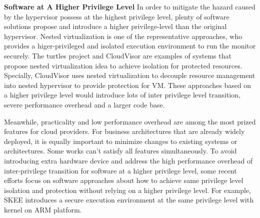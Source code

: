 \documentclass[conference]{IEEEtran}
\begin{document}
 
\textbf{Software at A Higher Privilege Level}
In order to mitigate the hazard caused by the hypervisor possess at the highest privilege level, plenty of software solutions propose and introduce a higher privilege-level than the original hypervisor. Nested virtualization is one of the representative approaches, who provides a higer-privileged and isolated 
execution environment to run the monitor securely. The turtles project \cite{Ben2007The} and CloudVisor \cite{Zhang2011CloudVisor} are examples of systems that propose nested virtualization idea to achieve isolation for protected resources. Specially, CloudVisor uses nested virtualization to decouple 
resource management into nested hypervisor to provide protection for VM. These approaches based on a higher privilege level would introduce lots of inter privilege level transition, severe performance overhead and a larger code base.

Meanwhile, practicality and low performance overhead are among the most prized features for cloud providers. For business architectures that are already widely deployed, it is equally important to minimize changes to existing systems or architectures. Some works can't satisfy all features simultaneously. To avoid introducing extra hardware device and address the high performance overhead of inter-privilege transition for software at a higher privilege level, some recent efforts focus on software approaches about how to achieve same privilege level isolation and protection without relying on a higher privilege level. For example, SKEE\cite{Azab2016SKEE} introduces a secure execution environment at the same privilege level with kernel on ARM platform. 
\end{document}
